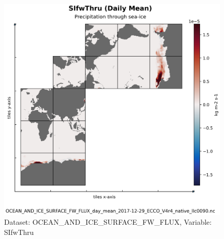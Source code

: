 \begin{figure}[H]
\centering
\includegraphics[scale=0.55]{../images/plots/native_plots/Ocean_and_Sea-Ice_Surface_Freshwater_Fluxes/SIfwThru.png}
\caption{Dataset: OCEAN\_AND\_ICE\_SURFACE\_FW\_FLUX, Variable: SIfwThru}
\label{tab:table-OCEAN_AND_ICE_SURFACE_FW_FLUX_SIfwThru-Plot}
\end{figure}
\pagebreak
